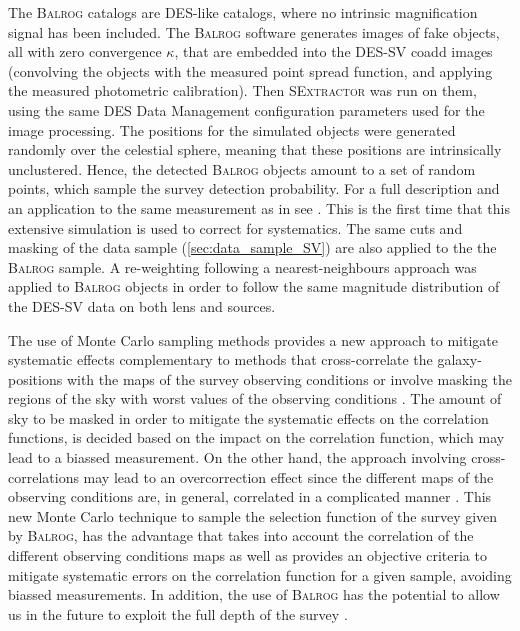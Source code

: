     The {\scshape Balrog} catalogs are DES-like catalogs, where
no intrinsic magnification signal has been included. The {\scshape Balrog} software generates images of fake objects, all with zero convergence $\kappa$, that are embedded into the DES-SV coadd images
(convolving the objects with the measured point spread function, and applying the measured photometric calibration). Then {\scshape SExtractor} was run on them, using the same DES Data Management configuration parameters used for the image processing. The positions for the simulated objects were generated randomly over the celestial sphere, meaning that these positions are intrinsically unclustered. Hence, the detected {\scshape Balrog} objects amount to a set of random points, which sample the survey detection probability. For a full description and an application to the same measurement as in \cite{2016MNRAS.455.4301C} see \cite{2016MNRAS.457..786S}. This is the first time that this extensive simulation is used to correct for systematics. The same cuts and masking of the data sample (\autoref{sec:data_sample_SV}) are also applied to the the {\scshape Balrog} sample. A re-weighting following a nearest-neighbours approach was applied to {\scshape Balrog} objects in order to follow the same magnitude distribution of the DES-SV data on both lens and sources.
    \newline
    
     The use of Monte Carlo sampling methods provides a new approach to mitigate systematic effects complementary to methods that cross-correlate the galaxy-positions with the maps of the survey observing conditions \cite{2012MNRAS.424..564R,2012ApJ...761...14H,2015MNRAS.454.3121M} or involve masking the regions of the sky with worst values of the observing conditions \cite{2016MNRAS.455.4301C}. The amount of sky to be masked in order to mitigate the systematic effects on the correlation functions, is decided based on the impact on the correlation function, which may lead to a biassed measurement. On the other hand, the approach involving cross-correlations may lead to an overcorrection effect since the different maps of the observing conditions are, in general, correlated in a complicated manner \cite{2016MNRAS.456.2095E}. This new Monte Carlo technique to sample the selection function of the survey given by {\scshape Balrog}, has the advantage that takes into account the correlation of the different observing conditions maps as well as provides an objective criteria to mitigate systematic errors on the correlation function for a given sample, avoiding biassed measurements. In addition, the use of {\scshape Balrog} has the potential to allow us in the future to exploit the full depth of the survey \cite{2016MNRAS.457..786S}.
\newline

